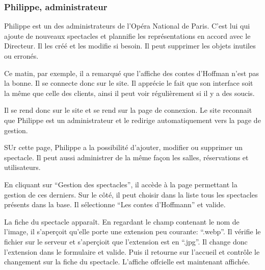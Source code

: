 \subsubsection{Philippe, administrateur}\label{philippe-administrateur}

Philippe est un des administrateurs de l'Opéra National de Paris. C'est
lui qui ajoute de nouveaux spectacles et plannifie les représentations
en accord avec le Directeur. Il les créé et les modifie si besoin. Il
peut supprimer les objets inutiles ou erronés.

Ce matin, par exemple, il a remarqué que l'affiche des contes d'Hoffman
n'est pas la bonne. Il se connecte donc sur le site. Il apprécie le fait
que son interface soit la même que celle des clients, ainsi il peut voir
régulièrement si il y a des soucis.

Il se rend donc sur le site et se rend sur la page de connexion. Le site
reconnait que Philippe est un administrateur et le redirige
automatiquement vers la page de gestion.

SUr cette page, Philippe a la possibilité d'ajouter, modifier ou
supprimer un spectacle. Il peut aussi administrer de la même façon les
salles, réservations et utilisateurs.

En cliquant sur ``Gestion des spectacles'', il accède à la page
permettant la gestion de ces derniers. Sur le côté, il peut choisir dans
la liste tous les spectacles présents dans la base. Il sélectionne ``Les
contes d'Hoffmann'' et valide.

La fiche du spectacle apparaît. En regardant le champ contenant le nom
de l'image, il s'aperçoit qu'elle porte une extension peu courante:
``.webp''. Il vérifie le fichier sur le serveur et s'aperçioit que
l'extension est en ``.jpg''. Il change donc l'extension dans le
formulaire et valide. Puis il retourne sur l'accueil et contrôle le
changement sur la fiche du spectacle. L'affiche offcielle est maintenant
affichée.
